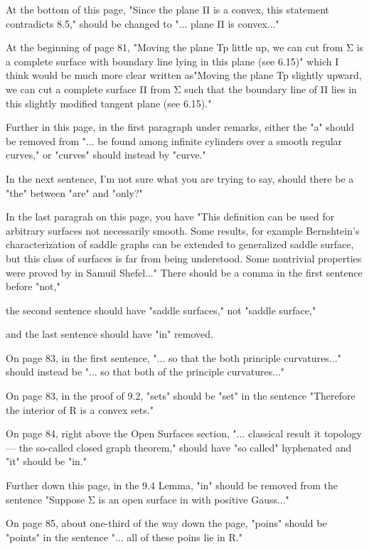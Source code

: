  At the bottom of this page, "Since the plane Π is a convex, this statement contradicts 8.5," should be changed to "... plane Π is convex..." 
 
 At the beginning of page 81, "Moving the plane Tp little up, we can cut from Σ is a complete surface with boundary line lying in this plane (see 6.15)" which I think would be much more clear written as"Moving the plane Tp slightly upward, we can cut a complete surface  Π  from Σ such that the boundary line of Π lies in this slightly modified tangent plane (see 6.15)." 
 
 Further in this page, in the first paragraph under remarks, either the "a" should be removed from "... be found among infinite cylinders over a smooth regular curves," or "curves" should instead by "curve." 
 
 In the next sentence, I'm not sure what you are trying to say, should there be a "the" between "are" and "only?"
 
 In the last paragrah on this page, you have "This definition can be used for arbitrary surfaces not necessarily smooth. Some results, for example Bernshtein’s characterization of saddle graphs can be extended to generalized saddle surface, but this class of surfaces is far from being understood. Some nontrivial properties were proved by in Samuil Shefel..." There should be a comma in the first sentence before "not,"
 
 the second sentence should have "saddle surfaces," not "saddle surface," 
 
 and the last sentence should have "in" removed. 
 
 On page 83, in the first sentence, "...  so that the both principle curvatures..." should instead be "... so that both of the principle curvatures..." 
 
 On page 83, in the proof of 9.2, "sets" should be "set" in the sentence "Therefore the interior of R is a convex sets." 
 
 On page 84, right above the Open Surfaces section, "... classical result it topology — the so-called closed graph theorem," should have "so called" hyphenated and "it" should be "in." 
 
 Further down this page, in the 9.4 Lemma, "in" should be removed from the sentence "Suppose Σ is an open surface in with positive Gauss..." 
 
 On page 85, about one-third of the way down the page, "poins" should be "points" in the sentence "... all of these poins lie in R." 
 
